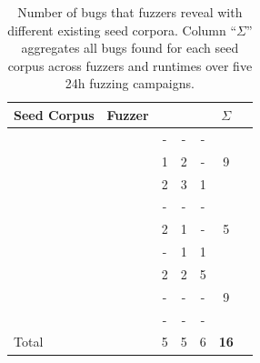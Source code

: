 \begin{table}[t]
    \caption{\label{tab:prelim_bugs}Number of bugs that fuzzers reveal with different existing seed corpora. Column ``$\Sigma$'' aggregates all bugs found for each seed corpus across fuzzers and runtimes over five 24h fuzzing campaigns.} 
    \footnotesize
    \centering
    \setlength{\tabcolsep}{2.8pt}
    \begin{tabular}{llccccr}
        \toprule
        \textbf{Seed Corpus} & \textbf{Fuzzer} & \textbf{\wasmer{}} & \textbf{\wamr{}} & \textbf{\wasmedge{}} & \textbf{$\Sigma$} \\ 
        \midrule
        \multirow{3}{*}{\llvmbench{}} 
            & \wadiff{}    & - & - & - & \multirow{3}{*}{9} \\
            & \wasmaker{}  & 1 & 2 & - &  \\
            & \wapplique{} & 2 & 3 & 1 &  \\ 
        \midrule
        \multirow{3}{*}{\wasmbench{}} 
            & \wadiff{}    & - & - & - & \multirow{3}{*}{5} \\
            & \wasmaker{}  & 2 & 1 & - &  \\
            & \wapplique{} & - & 1 & 1 &  \\ 
        \midrule
        \multirow{3}{*}{\specbench{}} 
            & \wadiff{}    & 2 & 2 & 5 & \multirow{3}{*}{9} \\
            & \wasmaker{}  & - & - & - &  \\
            & \wapplique{} & - & - & - &  \\ 
        \midrule
        Total & & 5 & 5 & 6 & \textbf{16} \\
        \bottomrule
    \end{tabular}   
    \vspace{-5ex}
\end{table}